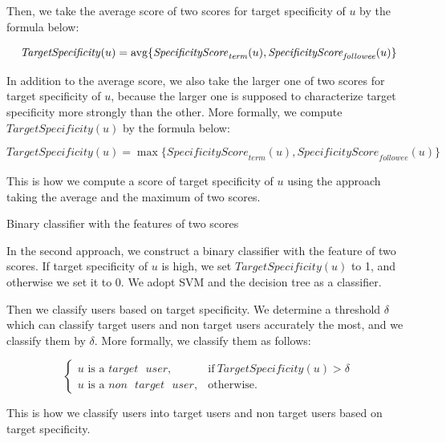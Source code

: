 Then, we take the average score of two scores for target specificity of
$u$ by the formula below:

\vspace{-4ex}
\[
 \mathit{TargetSpecificity}(u) = {\rm avg} \{
 \mathit{SpecificityScore}_{{\mathit{term}}}(u),
 \mathit{SpecificityScore}_{{\mathit{followee}}}(u)\}
\]
\vspace{-4ex}

In addition to the average score, we also take the larger one of two
scores for target specificity of $u$, because the larger one is supposed to
characterize target specificity more strongly than the other.  More
formally, we compute $\mathit{TargetSpecificity}(u)$ by the formula
below:

\vspace{-4ex}
\[
 \mathit{TargetSpecificity}(u) = \max \{
 \mathit{SpecificityScore}_{{\mathit{term}}}(u),
 \mathit{SpecificityScore}_{{\mathit{followee}}}(u)\}
\]
\vspace{-4ex}

This is how we compute a score of target specificity of $u$ using the
approach taking the average and the maximum of two scores.

\begin{description}
\bf{\item[(2)] Binary classifier with the features of two scores}
\label{item:Binary Classifier}
\end{description}

In the second approach, we construct a binary classifier with the feature of
two scores.  If target specificity of $u$ is high, we set
$\mathit{TargetSpecificity}(u)$ to 1, and otherwise we set it to 0.  We
adopt SVM and the decision tree as a classifier.


Then we classify users based on target specificity.  We determine a
threshold $\delta$ which can classify target users and non target users
accurately the most, and we classify them by $\delta$.  More formally,
we classify them as follows:

\vspace{-1ex}
\[
\begin{cases}
u\mbox{ is a } \mathit{target}\mbox{ }\mathit{user}, & \mbox{if}\
\mathit{TargetSpecificity}(u) > \delta \\
u\mbox{ is a }\mathit{non}\mbox{ }\mathit{target}\mbox{ }\mathit{user}, & \mbox{otherwise}.
\end{cases}
\]
\vspace{-2ex}

This is how we classify users into target users and non target users
based on target specificity.